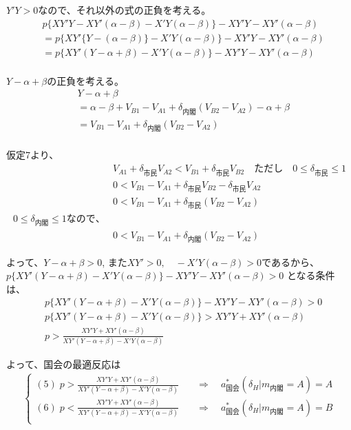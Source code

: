 \documentclass[main.tex]{subfiles}
\begin{document}
$Y'Y>0$なので、それ以外の式の正負を考える。
\begin{align*}
    &p \{   XY'Y - XY'(\alpha - \beta)  - X'Y(\alpha - \beta)  \}  -     XY'Y - XY'(\alpha - \beta) \\[1em]
    &= p \Big\{   XY' \{Y -(\alpha - \beta)\}  - X'Y(\alpha - \beta)  \Big\}  -     XY'Y - XY'(\alpha - \beta) \\[1em]
    &= p \Big\{   XY' (Y -\alpha + \beta)  - X'Y(\alpha - \beta)  \Big\}  -     XY'Y - XY'(\alpha - \beta) \\[1em]
\end{align*}

$Y -\alpha + \beta$の正負を考える。
\begin{align*}
    &Y -\alpha + \beta\\
    &= \alpha-\beta + V_{B1}-V_{A1} + \delta_{内閣}(V_{B2} - V_{A2}) -\alpha + \beta\\[1em]
    &= V_{B1}-V_{A1} + \delta_{内閣}(V_{B2} - V_{A2}) \\
\end{align*}

仮定7より、
\begin{align*}
    &V_{A1} + \delta_{市民} V_{A2} < V_{B1} + \delta_{市民} V_{B2} \quad{ただし}\quad 0 \le \delta_{市民}\le 1\\
    & 0 <  V_{B1} - V_{A1}+ \delta_{市民} V_{B2} -  \delta_{市民} V_{A2}\\
    & 0 <  V_{B1} - V_{A1}+ \delta_{市民} (V_{B2} - V_{A2})\\
    0 \le \delta_{内閣} \le 1 なので、\\
    & 0 <  V_{B1} - V_{A1}+ \delta_{内閣} (V_{B2} - V_{A2})
\end{align*}

よって、$Y -\alpha + \beta>0$,
また$ XY' >0, \quad - X'Y(\alpha - \beta)>0$であるから、\\
$p \Big\{   XY' (Y -\alpha + \beta)  - X'Y(\alpha - \beta)  \Big\}  -     XY'Y - XY'(\alpha - \beta) > 0$ となる条件は、
\begin{align*}
&p \Big\{   XY' (Y -\alpha + \beta)  - X'Y(\alpha - \beta)  \Big\}  -     XY'Y - XY'(\alpha - \beta) > 0 \\[1em]
&p \Big\{   XY' (Y -\alpha + \beta)  - X'Y(\alpha - \beta)  \Big\}   > XY'Y + XY'(\alpha - \beta) \\[1em]
&p  > \frac{XY'Y + XY'(\alpha - \beta)}{XY' (Y -\alpha + \beta)  - X'Y(\alpha - \beta) } 
\end{align*}


よって、国会の最適反応は
\begin{align*}
    \begin{cases}
        (5)\; p  > \frac{XY'Y + XY'(\alpha - \beta)}{XY' (Y -\alpha + \beta)  - X'Y(\alpha - \beta) }   &\quad\Rightarrow\quad a^*_{国会}(\delta_H|m_{内閣} = A) = A\\[0.5em]
        (6)\; p  < \frac{XY'Y + XY'(\alpha - \beta)}{XY' (Y -\alpha + \beta)  - X'Y(\alpha - \beta) } &\quad\Rightarrow\quad a^*_{国会}(\delta_H|m_{内閣} = A) = B\\[0.5em] 
    \end{cases}
\end{align*}
\end{document}
